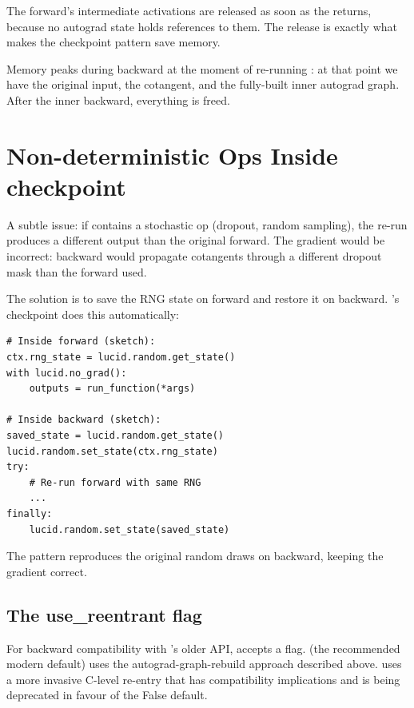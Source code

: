 The forward's intermediate activations are released as soon as
the  returns, because no autograd state holds
references to them. The release is exactly what makes the
checkpoint pattern save memory.

Memory peaks during backward at the moment of re-running
: at that point we have the original input,
the cotangent, and the fully-built inner autograd graph. After the
inner backward, everything is freed.

\section{Non-deterministic Ops Inside checkpoint}
\label{sec:gradient_checkpointing:nondet}

A subtle issue: if  contains a stochastic op
(dropout, random sampling), the re-run produces a different output
than the original forward. The gradient would be incorrect:
backward would propagate cotangents through a different dropout
mask than the forward used.

The solution is to save the RNG state on forward and restore it
on backward. \Lucid's checkpoint does this automatically:

\begin{lstlisting}[style=lucid,language=LucidPython]
# Inside forward (sketch):
ctx.rng_state = lucid.random.get_state()
with lucid.no_grad():
    outputs = run_function(*args)

# Inside backward (sketch):
saved_state = lucid.random.get_state()
lucid.random.set_state(ctx.rng_state)
try:
    # Re-run forward with same RNG
    ...
finally:
    lucid.random.set_state(saved_state)
\end{lstlisting}

The pattern reproduces the original random draws on backward,
keeping the gradient correct.

\subsection{The use\_reentrant flag}
\label{ssec:gradient_checkpointing:reentrant}

For backward compatibility with 's older API,
 accepts a  flag.
 (the recommended modern default) uses
the autograd-graph-rebuild approach described above.
 uses a more invasive C-level
re-entry that has compatibility implications and is being
deprecated in favour of the False default.

